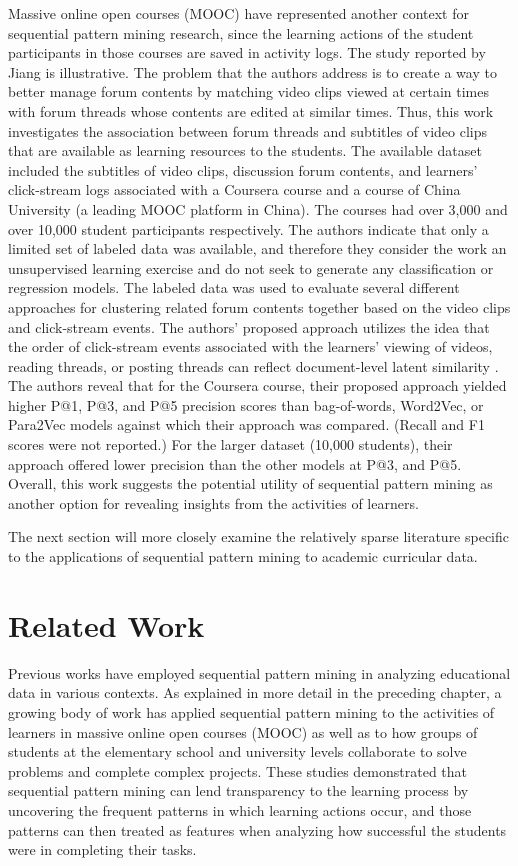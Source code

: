 Massive online open courses (MOOC) have represented another context for sequential pattern mining research, since the learning actions of the student participants in those courses are saved in activity logs.  The study reported by Jiang \cite{Jiang} is illustrative.  The problem that the authors address is to create a way to better manage forum contents by matching video clips viewed at certain times with forum threads whose contents are edited at similar times.  Thus, this work investigates the association between forum threads and subtitles of video clips that are available as learning resources to the students.  The available dataset included the subtitles of video clips, discussion forum contents, and learners' click-stream logs associated with a Coursera course and a course of China University (a leading MOOC platform in China).  The courses had over 3,000 and over 10,000 student participants respectively.  The authors indicate that only a limited set of labeled data was available, and therefore they consider the work an unsupervised learning exercise and do not seek to generate any classification or regression models.  The labeled data was used to evaluate several different approaches for clustering related forum contents together based on the video clips and click-stream events.  The authors' proposed approach utilizes the idea that the order of click-stream events associated with the learners' viewing of videos, reading threads, or posting threads can reflect document-level latent similarity \cite[Figure 1]{Jiang}.  
The authors reveal that for the Coursera course, their proposed approach yielded higher P@1, P@3, and P@5 precision scores than bag-of-words, Word2Vec, or Para2Vec models against which their approach was compared.  (Recall and F1 scores were not reported.)  For the larger dataset (10,000 students), their approach offered lower precision than the other models at P@3, and P@5.  Overall, this work suggests the potential utility of sequential pattern mining as another option for revealing insights from the activities of learners.

The next section will more closely examine the relatively sparse literature specific to the applications of sequential pattern mining to academic curricular data.  

\section{Related Work}

Previous works have employed sequential pattern mining in analyzing educational data in various contexts.  As explained in more detail in the preceding chapter, a growing body of work has applied sequential pattern mining to the activities of learners in massive online open courses (MOOC) \cite{Jiang} as well as to how groups of students at the elementary school \cite{Martinez} and university \cite{Perera} levels collaborate to solve problems and complete complex projects.  These studies demonstrated that sequential pattern mining can lend transparency to the learning process by uncovering the frequent patterns in which learning actions occur, and those patterns can then treated as features when analyzing how successful the students were in completing their tasks.

